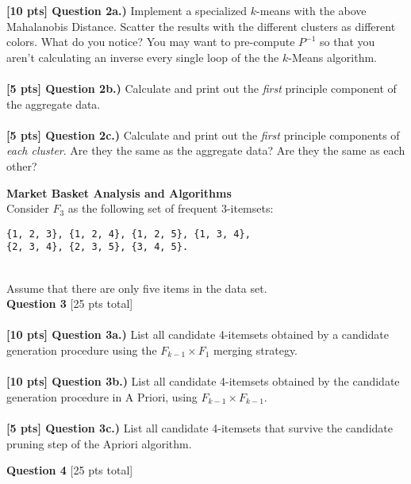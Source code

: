 \documentclass[paper=a4, fontsize=11pt]{scrartcl} %
\begin{document}
\textbf{[10 pts] Question 2a.)} Implement a specialized $k$-means with the above Mahalanobis Distance. Scatter the results with the different clusters as different colors. What do you notice? You may want to pre-compute $P^{-1}$ so that you aren't calculating an inverse every single loop of the the $k$-Means algorithm. \\
\\
\textbf{[5 pts] Question 2b.)}
Calculate and print out the \emph{first} principle component of the aggregate data. \\
\\
\textbf{[5 pts] Question 2c.)}
Calculate and print out the \emph{first} principle components of \emph{each cluster}. Are they the same as the aggregate data? Are they the same as each other?\\
\vspace{10mm}

{\huge \textbf{Market Basket Analysis and Algorithms}} \\

Consider $F_3$ as the following set of frequent 3-itemsets:

\begin{verbatim}
{1, 2, 3}, {1, 2, 4}, {1, 2, 5}, {1, 3, 4}, 
{2, 3, 4}, {2, 3, 5}, {3, 4, 5}.
\end{verbatim} \\

Assume that there are only five items in the data set. \\

{\Large \textbf{Question 3} [25 pts total]} \\
\\
\textbf{[10 pts] Question 3a.)} List all candidate 4-itemsets obtained by a candidate generation procedure using the $F_{k - 1} \times F_1$ merging strategy. \\
\\
\textbf{[10 pts] Question 3b.)} List all candidate 4-itemsets obtained by the candidate generation procedure in A Priori, using $F_{k-1} \times F_{k-1}$. \\
\\
\textbf{[5 pts] Question 3c.)} List all candidate 4-itemsets that survive the candidate pruning step of
the Apriori algorithm. \\
\vspace{10mm}

{\Large \textbf{Question 4} [25 pts total]} \\
 
\end{document}
